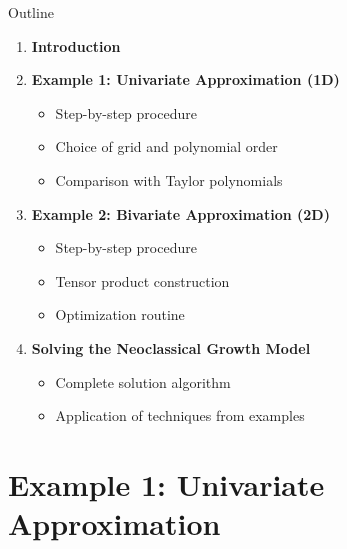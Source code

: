 \documentclass[9pt,xcolor={usenames, dvipsnames}]{beamer}
\theoremstyle{definition}
\begin{document}
\begin{frame}{Outline}

\begin{enumerate}
    \item \textbf{Introduction}
        \vspace{0.2cm}
      
    \item \textbf{Example 1: Univariate Approximation (1D)}
        \begin{itemize}
            \item Step-by-step procedure
            \item Choice of grid and polynomial order
            \item Comparison with Taylor polynomials
        \end{itemize}
        \vspace{0.3cm}
      
    \item \textbf{Example 2: Bivariate Approximation (2D)}
        \begin{itemize}
            \item Step-by-step procedure
            \item Tensor product construction
            \item Optimization routine
        \end{itemize}
        \vspace{0.3cm}
        
    \item \textbf{Solving the Neoclassical Growth Model}
        \begin{itemize}
            \item Complete solution algorithm
            \item Application of techniques from examples
        \end{itemize}
        \vspace{0.3cm}
        
\end{enumerate}

\end{frame}

\setcounter{section}{2}
\section[Example 1: 1D Approximation]{Example 1: Univariate Approximation}
\end{document}
